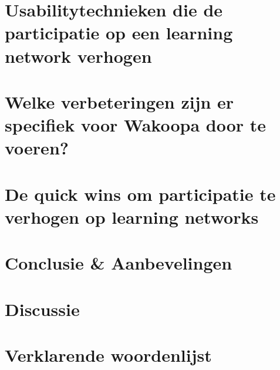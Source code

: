 \documentclass[a4paper, 10pt, pdftex]{report}
\begin{document}
  \newpage
  \chapter{Usabilitytechnieken die de participatie op een learning network verhogen}


  \newpage
  \chapter{Welke verbeteringen zijn er specifiek voor Wakoopa door te voeren?}
    \newpage

  \newpage
  \chapter{De quick wins om participatie te verhogen op learning networks}
    \newpage

  \newpage
  \chapter*{Conclusie \& Aanbevelingen}

  \newpage
  \chapter*{Discussie}

  \newpage
  \chapter*{Verklarende woordenlijst}

  \newpage
  
  
\end{document}
